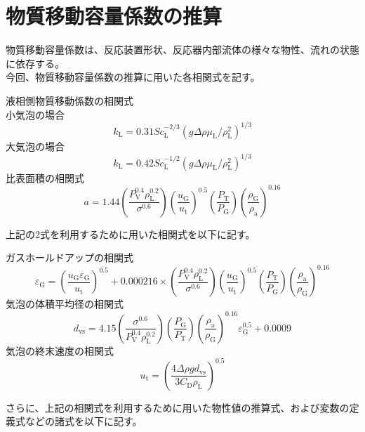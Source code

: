 \documentclass[a4j]{jsreport}
\begin{document}
\section{物質移動容量係数の推算}
物質移動容量係数は、反応装置形状、反応器内部流体の様々な物性、流れの状態に依存する。\\
今回、物質移動容量係数の推算に用いた各相関式を記す。
\par
液相側物質移動係数の相関式\\
小気泡の場合
\begin{equation}
    k_{\mathrm{ L}} = 0.31Sc_{\mathrm{ L}}^{-2/3}(g \Delta \rho \mu_{\mathrm{ L}}/\rho_{\mathrm{ L}}^2)^{1/3}
\end{equation}
大気泡の場合
\begin{equation}
    k_{\mathrm{ L}} = 0.42Sc_{\mathrm{ L}}^{-1/2}(g \Delta \rho \mu_{\mathrm{ L}}/\rho_{\mathrm{ L}}^2)^{1/3}
\end{equation}
比表面積の相関式
\begin{equation}
    a = 1.44(\frac{P_{\mathrm{ V}}^{0.4} \rho_{\mathrm{ L}}^{0.2} }{ \sigma^{0.6}})(\frac{u_{\mathrm{ G}}}{u_{\mathrm{ t}}})^{0.5}(\frac{P_{\mathrm{ T}}}{P_{\mathrm{ G}}})(\frac{\rho_{\mathrm{ G}}}{\rho_{\mathrm{ a}}})^{0.16}
\end{equation}

上記の2式を利用するために用いた相関式を以下に記す。

ガスホールドアップの相関式
\begin{equation}
    \varepsilon_{\mathrm{ G}} = (\frac{u_{\mathrm{ G}}\varepsilon_{\mathrm{ G}}}{u_{\mathrm{ t}}}) ^{0.5} + 0.000216 \times(\frac{P_{\mathrm{ V}}^{0.4} \rho_{\mathrm{ L}}^{0.2} }{ \sigma^{0.6}})(\frac{u_{\mathrm{ G}}}{u_{\mathrm{ t}}})^{0.5}(\frac{P_{\mathrm{ T}}}{P_{\mathrm{ G}}})(\frac{\rho_{\mathrm{ a}}}{\rho_{\mathrm{ G}}})^{0.16}
\end{equation}
気泡の体積平均径の相関式
\begin{equation}
    d_{\mathrm{ vs}} = 4.15 (\frac{\sigma^{0.6}}{P_{\mathrm{ V}}^{0.4} \rho_{\mathrm{ L}}^{0.2}})(\frac{P_{\mathrm{ G}}}{P_{\mathrm{ T}}})(\frac{\rho_{\mathrm{ a}}}{\rho_{\mathrm{ G}}})^{0.16} \varepsilon_{\mathrm{ G}}^{0.5} + 0.0009
\end{equation}
気泡の終末速度の相関式
\begin{equation}
    u_{\mathrm{ t}} = (\frac{4\Delta \rho g d_{\mathrm{ vs}}}{3C_{\mathrm{ D}}\rho_{\mathrm{ L}}})^{0.5}
\end{equation}

さらに、上記の相関式を利用するために用いた物性値の推算式、および変数の定義式などの諸式を以下に記す。
\end{document}
